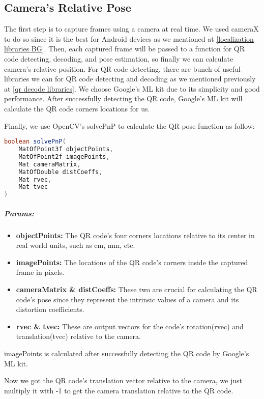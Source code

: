 \subsection{Camera's Relative Pose}
The first step is to capture frames using a camera at real time. We used cameraX to do so since it is the best for Android devices as we mentioned at \ref{localization libraries BG}. Then, each captured frame will be passed to a function for QR code detecting, decoding, and pose estimation, so finally we can calculate camera's relative position. For QR code detecting, there are bunch of useful libraries we can for QR code detecting and decoding as we mentioned previously at \ref{qr decode libraries}. We choose Google's ML kit due to its simplicity and good performance. After successfully detecting the QR code, Google's ML kit will calculate the QR code corners locations for us.

Finally, we use OpenCV's solvePnP to calculate the QR pose function as follow:

\begin{lstlisting}[language=Java]
boolean solvePnP(
	MatOfPoint3f objectPoints, 
	MatOfPoint2f imagePoints, 
	Mat cameraMatrix, 
	MatOfDouble distCoeffs, 
	Mat rvec, 
	Mat tvec
)
\end{lstlisting}

\subparagraph{Params:}

\begin{itemize}
	\item \textbf{objectPoints:}
	The QR code's four corners locations relative to its center in real world units, such as cm, mm, etc.
	\item \textbf{imagePoints:}
	The locations of the QR code's corners inside the captured frame in pixels.
	
	\item \textbf{cameraMatrix \& distCoeffs:}
	These two are crucial for calculating the QR code's pose since they represent the intrinsic values of a camera and its distortion coefficients.
	
	\item \textbf{rvec \& tvec:}
	These are output vectors for the code's rotation(rvec) and translation(tvec) relative to the camera.
\end{itemize}
imagePoints is calculated after successfully detecting the QR code by Google's ML kit.

Now we got the QR code's translation vector relative to the camera, we just multiply it with -1 to get the camera translation relative to the QR code.